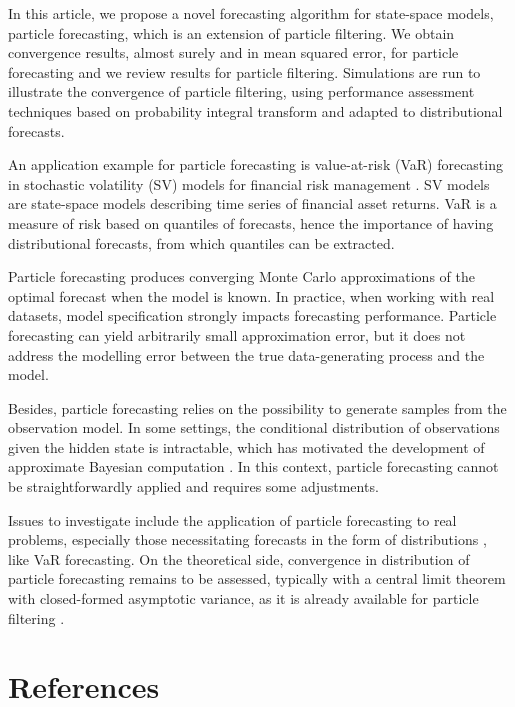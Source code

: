 \documentclass{article}
\begin{document}
In this article, we propose a novel forecasting algorithm for state-space models, particle forecasting, which is an extension of particle filtering. We obtain convergence results, almost surely and in mean squared error, for particle forecasting and we review results for particle filtering. Simulations are run to illustrate the convergence of particle filtering, using performance assessment techniques based on probability integral transform and adapted to distributional forecasts.

An application example for particle forecasting is value-at-risk (VaR) forecasting in stochastic volatility (SV) models for financial risk management \cite{BuiQuang2018}. SV models are state-space models describing time series of financial asset returns. VaR is a measure of risk based on quantiles of forecasts, hence the importance of having distributional forecasts, from which quantiles can be extracted.

Particle forecasting produces converging Monte Carlo approximations of the optimal forecast when the model is known. In practice, when working with real datasets, model specification strongly impacts forecasting performance. Particle forecasting can yield arbitrarily small approximation error, but it does not address the modelling error between the true data-generating process and the model.

Besides, particle forecasting relies on the possibility to generate samples from the observation model. In some settings, the conditional distribution of observations given the hidden state is intractable, which has motivated the development of approximate Bayesian computation \cite{Jasra2012}. In this context, particle forecasting cannot be straightforwardly applied and requires some adjustments.

Issues to investigate include the application of particle forecasting to real problems, especially those necessitating forecasts in the form of distributions \cite{Gneiting2014}, like VaR forecasting. On the theoretical side, convergence in distribution of particle forecasting remains to be assessed, typically with a central limit theorem with closed-formed asymptotic variance, as it is already available for particle filtering \cite{Chopin2004}.

\section*{References}


\end{document}
